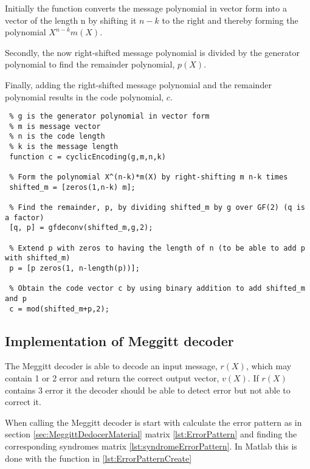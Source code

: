 \documentclass[Main]{subfiles}
\begin{document}
Initially the function converts the message polynomial in vector form into a vector of the length n by shifting it $n-k$ to the right and thereby forming the polynomial $X^{n-k}m(X)$. 

Secondly, the now right-shifted message polynomial is divided by the generator polynomial to find the remainder polynomial, $p(X)$.

Finally, adding the right-shifted message polynomial and the remainder polynomial results in the code polynomial, $c$.  

\begin{lstlisting}[caption=Cyclic Encoder, style=Code-Matlab, label=lst:refID]
 % cyclicEncoding is a function that encodes a message vector into systematic code given the following parameters
 % g is the generator polynomial in vector form
 % m is message vector
 % n is the code length
 % k is the message length
 function c = cyclicEncoding(g,m,n,k)

 % Form the polynomial X^(n-k)*m(X) by right-shifting m n-k times 
 shifted_m = [zeros(1,n-k) m];

 % Find the remainder, p, by dividing shifted_m by g over GF(2) (q is a factor)
 [q, p] = gfdeconv(shifted_m,g,2);

 % Extend p with zeros to having the length of n (to be able to add p with shifted_m)
 p = [p zeros(1, n-length(p))];

 % Obtain the code vector c by using binary addition to add shifted_m and p 
 c = mod(shifted_m+p,2);
\end{lstlisting}







\subsection{Implementation of Meggitt decoder}
\label{sec:ImplementMeggittDecoder}
The Meggitt decoder is able to decode an input message, $r(X)$, which may contain 1 or 2 error and return the correct output vector, $v(X)$.
If $r(X)$ contains 3 error it the decoder should be able to detect error but not able to correct it.

When calling the Meggitt decoder is start with calculate the error pattern as in section \ref{sec:MeggittDedocerMaterial} matrix \ref{lst:ErrorPattern} and finding the corresponding syndromes matrix \ref{lst:syndromeErrorPattern}.
In Matlab this is done with the function in \codeTitle \ref{lst:ErrorPatternCreate}
\end{document}
